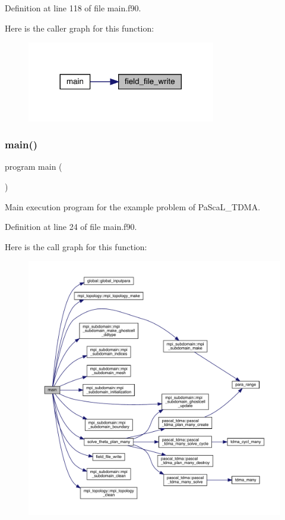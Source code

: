 Definition at line 118 of file main.\+f90.

Here is the caller graph for this function\+:
\nopagebreak
\begin{figure}[H]
\begin{center}
\leavevmode
\includegraphics[width=233pt]{main_8f90_af0a1310807f21ee1a2c0fdf14c58b63b_icgraph}
\end{center}
\end{figure}
\mbox{\label{main_8f90_a8ec2266d83cd6c0b762cbcbc92c0af3d}} 
\subsubsection{\texorpdfstring{main()}{main()}}
{\footnotesize\ttfamily program main (\begin{DoxyParamCaption}{ }\end{DoxyParamCaption})}



Main execution program for the example problem of Pa\+Sca\+L\+\_\+\+T\+D\+MA. 



Definition at line 24 of file main.\+f90.

Here is the call graph for this function\+:
\nopagebreak
\begin{figure}[H]
\begin{center}
\leavevmode
\includegraphics[width=350pt]{main_8f90_a8ec2266d83cd6c0b762cbcbc92c0af3d_cgraph}
\end{center}
\end{figure}
